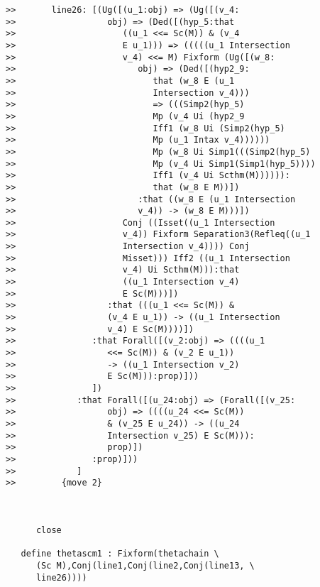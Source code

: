 \documentclass[12pt]{article}
\begin{document}
\begin{verbatim}
>>       line26: [(Ug([(u_1:obj) => (Ug([(v_4:
>>                  obj) => (Ded([(hyp_5:that
>>                     ((u_1 <<= Sc(M)) & (v_4
>>                     E u_1))) => (((((u_1 Intersection
>>                     v_4) <<= M) Fixform (Ug([(w_8:
>>                        obj) => (Ded([(hyp2_9:
>>                           that (w_8 E (u_1
>>                           Intersection v_4)))
>>                           => (((Simp2(hyp_5)
>>                           Mp (v_4 Ui (hyp2_9
>>                           Iff1 (w_8 Ui (Simp2(hyp_5)
>>                           Mp (u_1 Intax v_4))))))
>>                           Mp (w_8 Ui Simp1(((Simp2(hyp_5)
>>                           Mp (v_4 Ui Simp1(Simp1(hyp_5))))
>>                           Iff1 (v_4 Ui Scthm(M)))))):
>>                           that (w_8 E M))])
>>                        :that ((w_8 E (u_1 Intersection
>>                        v_4)) -> (w_8 E M)))])
>>                     Conj ((Isset((u_1 Intersection
>>                     v_4)) Fixform Separation3(Refleq((u_1
>>                     Intersection v_4)))) Conj
>>                     Misset))) Iff2 ((u_1 Intersection
>>                     v_4) Ui Scthm(M))):that
>>                     ((u_1 Intersection v_4)
>>                     E Sc(M)))])
>>                  :that (((u_1 <<= Sc(M)) &
>>                  (v_4 E u_1)) -> ((u_1 Intersection
>>                  v_4) E Sc(M))))])
>>               :that Forall([(v_2:obj) => ((((u_1
>>                  <<= Sc(M)) & (v_2 E u_1))
>>                  -> ((u_1 Intersection v_2)
>>                  E Sc(M))):prop)]))
>>               ])
>>            :that Forall([(u_24:obj) => (Forall([(v_25:
>>                  obj) => ((((u_24 <<= Sc(M))
>>                  & (v_25 E u_24)) -> ((u_24
>>                  Intersection v_25) E Sc(M))):
>>                  prop)])
>>               :prop)]))
>>            ]
>>         {move 2}



      close

   define thetascm1 : Fixform(thetachain \
      (Sc M),Conj(line1,Conj(line2,Conj(line13, \
      line26))))


\end{verbatim}
\end{document}
